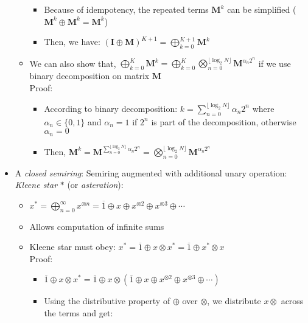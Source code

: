 \begin{itemize}
\begin{itemize}
\begin{itemize}
            \item Because of idempotency, the repeated terms $ \boldsymbol{M}^k $ can be simplified ($ \boldsymbol{M}^k \oplus \boldsymbol{M}^k = \boldsymbol{M}^k$)
            \item Then, we have: $(\boldsymbol{I} \oplus \boldsymbol{M})^{K+1} = \bigoplus_{k=0}^{K+1} \boldsymbol{M}^k$
        \end{itemize}
        \item We can also show that, $ \bigoplus_{k=0}^{K} \boldsymbol{M}^k = \bigoplus_{k=0}^{K} \bigotimes_{n=0}^{\lfloor \log_2 N \rfloor} \boldsymbol{M}^{\alpha_n 2^n}$ if we use binary decomposition on matrix $\boldsymbol{M}$\\
        Proof:
        \begin{itemize}
            \item According to binary decomposition: $k = \sum_{n=0}^{\lfloor \log_2 N \rfloor} \alpha_n 2^n$ where $\alpha_n \in \{0, 1\}$ and $\alpha_n = 1$ if $2^n$ is part of the decomposition, otherwise $\alpha_n = 0$
            \item Then, $\boldsymbol{M}^k = \boldsymbol{M}^{\sum_{n=0}^{\lfloor \log_2 N \rfloor} \alpha_n 2^n} = \bigotimes_{n=0}^{\lfloor \log_2 N \rfloor} \boldsymbol{M}^{\alpha_n 2^n}$
        \end{itemize}
    \end{itemize}
    \item A \emph{closed semiring}: Semiring augmented with additional unary operation: \emph{Kleene star} $*$ (or \emph{asteration}):
    \begin{itemize}
        \item $
        x^* = \bigoplus_{n=0}^\infty x^{\otimes n} = \overline{1} \oplus x \oplus x^{\otimes 2} \oplus x^{\otimes 3} \oplus \cdots
        $
        \item Allows computation of infinite sums
        \item Kleene star must obey:
        $
        x^* = \overline{1} \oplus x \otimes x^* = \overline{1} \oplus x^* \otimes x
        $\\
        Proof:
        \begin{itemize}
            \item $ \overline{1} \oplus x \otimes x^* = \overline{1} \oplus x \otimes \left( \overline{1} \oplus x \oplus x^{\otimes 2} \oplus x^{\otimes 3} \oplus \cdots \right)$
            \item Using the distributive property of $ \oplus $ over $ \otimes $, we distribute $ x \otimes $ across the terms and get:

\end{itemize}
\end{itemize}
\end{itemize}
